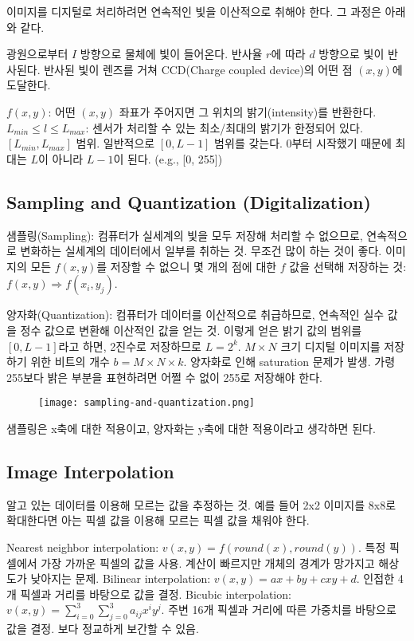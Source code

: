 이미지를 디지털로 처리하려면 연속적인 빛을 이산적으로 취해야 한다. 그 과정은 아래와 같다.

\benum
  \itm 광원으로부터 $I$ 방향으로 물체에 빛이 들어온다.
  \itm 반사율 $r$에 따라 $d$ 방향으로 빛이 반사된다.
  \itm 반사된 빛이 렌즈를 거쳐 CCD(Charge coupled device)의 어떤 점 $(x, y)$에 도달한다.
\eenum

\bitmz
  \itm $f(x, y)$: 어떤 $(x, y)$ 좌표가 주어지면 그 위치의 밝기(intensity)를 반환한다.
  \itm $L_{min} \leq l \leq L_{max}$:  센서가 처리할 수 있는 최소/최대의 밝기가 한정되어 있다.
  \itm $[L_{min}, L_{max}]$ 범위. 일반적으로 $[0, L - 1]$ 범위를 갖는다. 0부터 시작했기 때문에 최대는 $L$이 아니라 $L - 1$이 된다. (e.g., [0, 255])
\eitmz

\subsection{Sampling and Quantization (Digitalization)}

샘플링(Sampling): 컴퓨터가 실세계의 빛을 모두 저장해 처리할 수 없으므로, 연속적으로 변화하는 실세계의 데이터에서 일부를 취하는 것. 무조건 많이 하는 것이 좋다. 이미지의 모든 $f(x, y)$를 저장할 수 없으니 몇 개의 점에 대한 $f$ 값을 선택해 저장하는 것: $f(x, y) \Rightarrow f(x_i, y_j)$.

양자화(Quantization): 컴퓨터가 데이터를 이산적으로 취급하므로, 연속적인 실수 값을 정수 값으로 변환해 이산적인 값을 얻는 것. 이렇게 얻은 밝기 값의 범위를 $[0, L - 1]$라고 하면, 2진수로 저장하므로 $L = 2^k$. $M \times N$ 크기 디지털 이미지를 저장하기 위한 비트의 개수 $b = M \times N \times k$. 양자화로 인해 saturation 문제가 발생. 가령 255보다 밝은 부분을 표현하려면 어쩔 수 없이 255로 저장해야 한다.

\begin{figure}[h]
  \centering
  \texttt{[image: sampling-and-quantization.png]}
\end{figure}

샘플링은 x축에 대한 적용이고, 양자화는 y축에 대한 적용이라고 생각하면 된다.

\subsection{Image Interpolation}

알고 있는 데이터를 이용해 모르는 값을 추정하는 것. 예를 들어 2x2 이미지를 8x8로 확대한다면 아는 픽셀 값을 이용해 모르는 픽셀 값을 채워야 한다.

\bitmz
  \itm Nearest neighbor interpolation: $v(x, y) = f(round(x), round(y))$. 특정 픽셀에서 가장 가까운 픽셀의 값을 사용. 계산이 빠르지만 개체의 경계가 망가지고 해상도가 낮아지는 문제.
  \itm Bilinear interpolation: $v(x, y) = ax + by + cxy + d$. 인접한 4개 픽셀과 거리를 바탕으로 값을 결정.
  \itm Bicubic interpolation: $v(x, y) = \sum_{i=0}^3 \sum_{j=0}^3 a_{ij} x^i y^j$. 주변 16개 픽셀과 거리에 따른 가중치를 바탕으로 값을 결정. 보다 정교하게 보간할 수 있음.
\eitmz

